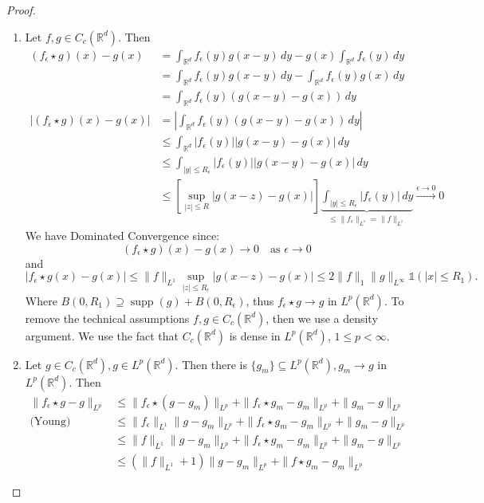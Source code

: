 \documentclass{report}
\theoremstyle{tommy}
\newcommand{\supp}{\operatorname{supp}}
\begin{document}
  \begin{proof}\
    \begin{enumerate}[label=Step \arabic*:]
      \item Let \(f, g \in C_c(\mathbb{R}^d)\). Then
      \begin{align*}
        (f_\epsilon \star g)(x) - g(x)
        &= \int_{\mathbb{R}^d} f_\epsilon(y) g(x-y) \, dy - g(x) \int_{\mathbb{R}^d} f_\epsilon(y) \, dy \\
        &= \int_{\mathbb{R}^d} f_\epsilon(y) g(x-y) \, dy - \int_{\mathbb{R}^d} f_\epsilon(y) g(x) \, dy \\
        &= \int_{\mathbb{R}^d} f_\epsilon(y) (g(x-y) - g(x)) \, dy \\
        |(f_\epsilon \star g)(x) - g(x)| 
        &= \left| \int_{\mathbb{R}^d} f_\epsilon(y) (g(x-y) - g(x)) \, dy \right| \\
        &\le \int_{\mathbb{R}^d} |f_\epsilon(y)| |g(x-y) - g(x)| \, dy \\
        &\le \int_{|y| \le R_\epsilon} |f_\epsilon(y)||g(x-y) - g(x)| \, dy \\
        &\le \left[\sup_{|z| \le R} |g(x-z) - g(x)| \right]  \underbrace{\int_{|y| \le R_\epsilon} |f_\epsilon(y)| \, dy}_{\le \|f_\epsilon\|_{L^1} = \|f\|_{L^1}} 
        \xrightarrow{\epsilon \to 0} 0
      \end{align*}
      We have Dominated Convergence since:
      \[(f_\epsilon \star g)(x) - g(x) \to 0 \quad \text{as } \epsilon \to 0\]
      and
      \[|f_\epsilon \star g(x) - g(x)| \le \|f\|_{L^1} \sup_{|z| \le R_\epsilon} |g(x-z) - g(x)| \le 2 \|f\|_1 \|g\|_{L^\infty} \mathbb{1}(|x| \le R_1).\]
      Where \(B(0, R_1) \supseteq \supp(g) + B(0, R_\epsilon)\), thus
      \(f_\epsilon \star g \to g\) in \(L^p(\mathbb{R}^d)\). To remove the technical assumptions \(f, g \in C_c(\mathbb{R}^d)\), then we use a density argument. We use the fact that \(C_c(\mathbb{R}^d)\) is dense in \(L^p(\mathbb{R}^d)\), \(1 \le p < \infty\).
      \item Let \(g \in C_c(\mathbb{R}^d), g \in L^p(\mathbb{R}^d)\). Then there is \(\{g_m\} \subseteq L^p(\mathbb{R}^d), g_m \to g\) in \(L^p(\mathbb{R}^d)\). Then 
      \begin{align*}
        \|f_\epsilon \star g - g\|_{L^p} 
        &\le \|f_\epsilon \star (g - g_m)\|_{L^p}  + \|f_\epsilon \star g_m - g_m \|_{L^p}+ \|g_m - g\|_{L^p} \\
        \text{(Young)} \quad &\le \|f_\epsilon\|_{L^1}\|g-g_m\|_{L^p}  + \|f_\epsilon \star g_m - g_m \|_{L^p}+ \|g_m - g\|_{L^p} \\
        &\le \|f\|_{L^1}\|g-g_m\|_{L^p}  + \|f_\epsilon \star g_m - g_m \|_{L^p}+ \|g_m - g\|_{L^p} \\
        &\le (\|f\|_{L^1} + 1) \|g - g_m\|_{L^p} + \|f \star g_m - g_m\|_{L^p}
      \end{align*}
      

\end{enumerate}
\end{proof}
\end{document}
